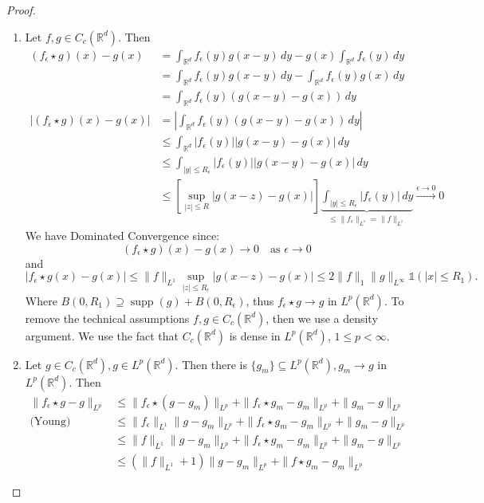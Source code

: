 \documentclass{report}
\theoremstyle{tommy}
\newcommand{\supp}{\operatorname{supp}}
\begin{document}
  \begin{proof}\
    \begin{enumerate}[label=Step \arabic*:]
      \item Let \(f, g \in C_c(\mathbb{R}^d)\). Then
      \begin{align*}
        (f_\epsilon \star g)(x) - g(x)
        &= \int_{\mathbb{R}^d} f_\epsilon(y) g(x-y) \, dy - g(x) \int_{\mathbb{R}^d} f_\epsilon(y) \, dy \\
        &= \int_{\mathbb{R}^d} f_\epsilon(y) g(x-y) \, dy - \int_{\mathbb{R}^d} f_\epsilon(y) g(x) \, dy \\
        &= \int_{\mathbb{R}^d} f_\epsilon(y) (g(x-y) - g(x)) \, dy \\
        |(f_\epsilon \star g)(x) - g(x)| 
        &= \left| \int_{\mathbb{R}^d} f_\epsilon(y) (g(x-y) - g(x)) \, dy \right| \\
        &\le \int_{\mathbb{R}^d} |f_\epsilon(y)| |g(x-y) - g(x)| \, dy \\
        &\le \int_{|y| \le R_\epsilon} |f_\epsilon(y)||g(x-y) - g(x)| \, dy \\
        &\le \left[\sup_{|z| \le R} |g(x-z) - g(x)| \right]  \underbrace{\int_{|y| \le R_\epsilon} |f_\epsilon(y)| \, dy}_{\le \|f_\epsilon\|_{L^1} = \|f\|_{L^1}} 
        \xrightarrow{\epsilon \to 0} 0
      \end{align*}
      We have Dominated Convergence since:
      \[(f_\epsilon \star g)(x) - g(x) \to 0 \quad \text{as } \epsilon \to 0\]
      and
      \[|f_\epsilon \star g(x) - g(x)| \le \|f\|_{L^1} \sup_{|z| \le R_\epsilon} |g(x-z) - g(x)| \le 2 \|f\|_1 \|g\|_{L^\infty} \mathbb{1}(|x| \le R_1).\]
      Where \(B(0, R_1) \supseteq \supp(g) + B(0, R_\epsilon)\), thus
      \(f_\epsilon \star g \to g\) in \(L^p(\mathbb{R}^d)\). To remove the technical assumptions \(f, g \in C_c(\mathbb{R}^d)\), then we use a density argument. We use the fact that \(C_c(\mathbb{R}^d)\) is dense in \(L^p(\mathbb{R}^d)\), \(1 \le p < \infty\).
      \item Let \(g \in C_c(\mathbb{R}^d), g \in L^p(\mathbb{R}^d)\). Then there is \(\{g_m\} \subseteq L^p(\mathbb{R}^d), g_m \to g\) in \(L^p(\mathbb{R}^d)\). Then 
      \begin{align*}
        \|f_\epsilon \star g - g\|_{L^p} 
        &\le \|f_\epsilon \star (g - g_m)\|_{L^p}  + \|f_\epsilon \star g_m - g_m \|_{L^p}+ \|g_m - g\|_{L^p} \\
        \text{(Young)} \quad &\le \|f_\epsilon\|_{L^1}\|g-g_m\|_{L^p}  + \|f_\epsilon \star g_m - g_m \|_{L^p}+ \|g_m - g\|_{L^p} \\
        &\le \|f\|_{L^1}\|g-g_m\|_{L^p}  + \|f_\epsilon \star g_m - g_m \|_{L^p}+ \|g_m - g\|_{L^p} \\
        &\le (\|f\|_{L^1} + 1) \|g - g_m\|_{L^p} + \|f \star g_m - g_m\|_{L^p}
      \end{align*}
      

\end{enumerate}
\end{proof}
\end{document}
